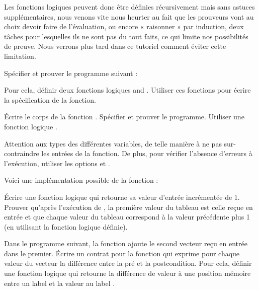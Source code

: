 Les fonctions logiques peuvent donc être définies récursivement mais sans astuces
supplémentaires, nous venons vite nous heurter au fait que les prouveurs vont au
choix devoir faire de l'évaluation, ou encore « raisonner » par induction, deux
tâches pour lesquelles ils ne sont pas du tout faits, ce qui limite nos
possibilités de preuve. Nous verrons plus tard dans ce tutoriel comment éviter
cette limitation.






Spécifier et prouver le programme suivant :




Pour cela, définir deux fonctions logiques  and .
Utiliser ces fonctions pour écrire la spécification de la fonction.




Écrire le corps de la fonction . Spécifier et prouver le
programme. Utiliser une fonction logique .




Attention aux types des différentes variables, de telle manière à ne pas
sur-contraindre les entrées de la fonction. De plus, pour vérifier l'absence
d'erreurs à l'exécution, utiliser les options 
et .




Voici une implémentation possible de la fonction  :




Écrire une fonction logique qui retourne sa valeur d'entrée incrémentée de 1.
Prouver qu'après l'exécution de , la première valeur du tableau
est celle reçue en entrée et que chaque valeur du tableau correspond à la valeur
précédente plus 1 (en utilisant la fonction logique définie).






Dans le programme suivant, la fonction  ajoute le second
vecteur reçu en entrée dans le premier. Écrire un contrat pour la fonction
 qui exprime pour chaque valeur du vecteur
 la différence entre la pré et la postcondition. Pour cela,
définir une fonction logique  qui retourne la différence de
valeur à une position mémoire entre un label  et la valeur au
label .



